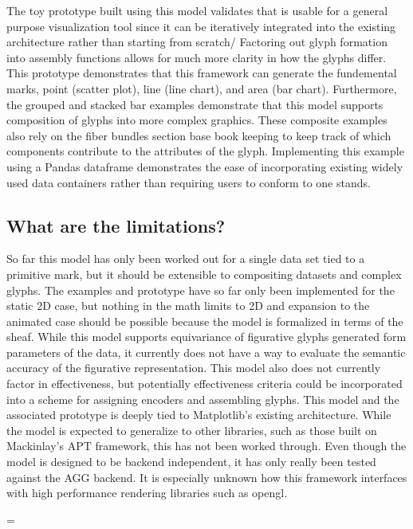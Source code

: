 \documentclass[../main.tex]{subfiles}
\begin{document}
The toy prototype built using this model validates that is usable for a general purpose visualization tool since it can be iteratively integrated into the existing architecture rather than starting from scratch/ Factoring out glyph formation into assembly functions allows for much more clarity in how the glyphs differ. This prototype demonstrates that this framework can generate the fundemental marks, point (scatter plot), line (line chart), and area (bar chart). Furthermore, the grouped and stacked bar examples demonstrate that this model supports composition of glyphs into more complex graphics. These composite examples also rely on the fiber bundles section base book keeping to keep track of which components contribute to the attributes of the glyph. Implementing this example using a Pandas dataframe demonstrates the ease of incorporating existing widely used data containers rather than requiring users to conform to one stands.  

\subsection{What are the limitations?}

So far this model has only been worked out for a single data set tied to a primitive mark, but it should be extensible to compositing datasets and complex glyphs. The examples and prototype have so far only been implemented for the static 2D case, but nothing in the math limits to 2D and expansion to the animated case should be possible because the model is formalized in terms of the sheaf. While this model supports equivariance of figurative glyphs generated form parameters of the data\cite{beckfeathers2014,byrneFigurativeFramesCritical2017}, it currently does not have a way to evaluate the semantic accuracy of the figurative representation. This model also does not currently factor in effectiveness, but potentially effectiveness criteria could be incorporated into a scheme for assigning encoders and assembling glyphs. This model and the associated prototype is deeply tied to Matplotlib's existing architecture. While the model is expected to generalize to other libraries, such as those built on Mackinlay's APT framework, this has not been worked through. Even though the model is designed to be backend independent, it has only really been tested against the AGG backend. It is especially unknown how this framework interfaces with high performance rendering libraries such as opengl\cite{CarsonOpenGL1997}.

=
\end{document}
